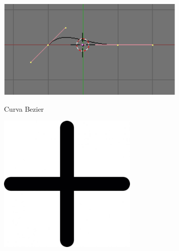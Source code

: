 \documentclass[notes,slidesec,a4]{seminar}
\begin{document}
\begin{hslide}
	\begin{minipage}{0.45\textwidth}
		\includegraphics[width=\textwidth]{InterfazBlender05.png}
		\begin{center}
			Curva Bezier
		\end{center}
	\end{minipage}
	\begin{minipage}{0.1\textwidth}
		\begin{center}
			\includegraphics[width=0.5\textwidth]{mas.jpg}
		\end{center}
	\end{minipage}
	\begin{minipage}{0.55\textwidth}

\end{minipage}
\end{hslide}
\end{document}
